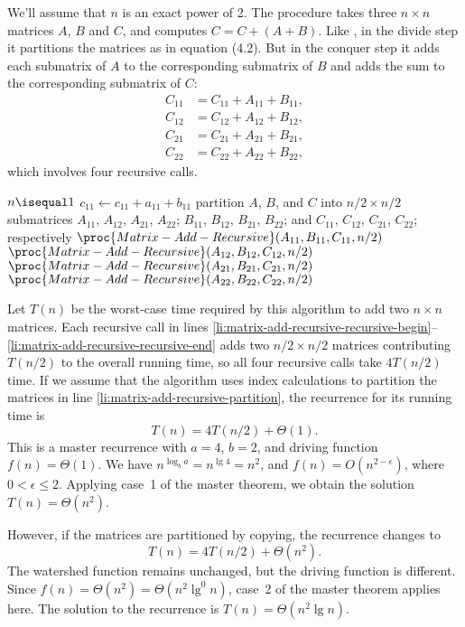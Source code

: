 We'll assume that $n$ is an exact power of 2.
The procedure  takes three $n\times n$ matrices $A$, $B$ and $C$, and computes $C=C+(A+B)$.
Like , in the divide step it partitions the matrices as in equation (4.2).
But in the conquer step it adds each submatrix of $A$ to the corresponding submatrix of $B$ and adds the sum to the corresponding submatrix of $C$:
\begin{align*}
    C_{11} &= C_{11}+A_{11}+B_{11}, \\
    C_{12} &= C_{12}+A_{12}+B_{12}, \\
    C_{21} &= C_{21}+A_{21}+B_{21}, \\
    C_{22} &= C_{22}+A_{22}+B_{22},
\end{align*}
which involves four recursive calls.

\begin{codebox}
\li \If $n\isequal1$
\li     \Then {}
\li         $c_{11}\gets c_{11}+a_{11}+b_{11}$
\li         \Return
        \End
\li {}
\li partition $A$, $B$, and $C$ into $n/2\times n/2$ submatrices
    \Indentmore
\zi     $A_{11}$, $A_{12}$, $A_{21}$, $A_{22}$; $B_{11}$, $B_{12}$, $B_{21}$, $B_{22}$;
\zi     and $C_{11}$, $C_{12}$, $C_{21}$, $C_{22}$; respectively
    \End \label{li:matrix-add-recursive-partition}
\li {}
\li $\proc{Matrix-Add-Recursive}(A_{11},B_{11},C_{11},n/2)$ \label{li:matrix-add-recursive-recursive-begin}
\li $\proc{Matrix-Add-Recursive}(A_{12},B_{12},C_{12},n/2)$
\li $\proc{Matrix-Add-Recursive}(A_{21},B_{21},C_{21},n/2)$
\li $\proc{Matrix-Add-Recursive}(A_{22},B_{22},C_{22},n/2)$ \label{li:matrix-add-recursive-recursive-end}
\end{codebox}

Let $T(n)$ be the worst-case time required by this algorithm to add two $n\times n$ matrices.
Each recursive call in lines \ref{li:matrix-add-recursive-recursive-begin}--\ref{li:matrix-add-recursive-recursive-end} adds two $n/2\times n/2$ matrices contributing $T(n/2)$ to the overall running time, so all four recursive calls take $4T(n/2)$ time.
If we assume that the algorithm uses index calculations to partition the matrices in line \ref{li:matrix-add-recursive-partition}, the recurrence for its running time is
\[
    T(n) = 4T(n/2)+\Theta(1).
\]
This is a master recurrence with $a=4$, $b=2$, and driving function $f(n)=\Theta(1)$.
We have $n^{\log_ba}=n^{\lg4}=n^2$, and $f(n)=O(n^{2-\epsilon})$, where $0<\epsilon\le2$.
Applying case~1 of the master theorem, we obtain the solution $T(n)=\Theta(n^2)$.

However, if the matrices are partitioned by copying, the recurrence changes to
\[
    T(n) = 4T(n/2)+\Theta(n^2).
\]
The watershed function remains unchanged, but the driving function is different.
Since $f(n)=\Theta(n^2)=\Theta(n^2\lg^0n)$, case~2 of the master theorem applies here.
The solution to the recurrence is $T(n)=\Theta(n^2\lg n)$.
